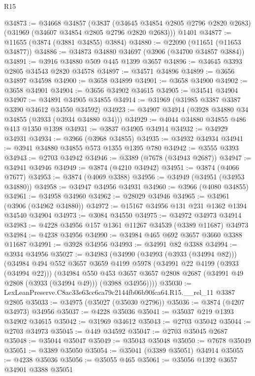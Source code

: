\begin{lexlean}{R15}
\begin{coremodule}
@34873 := @34668
    @34857
    (@3837 (@34645 @34854 @2805 @2796 @2820 @2683) (@31969 (@34607 @34854 @2805 @2796 @2820 @2683)))
    @1401
@34877 := @11655 (@3874 (@3881 @34855) @3884)
@34880 := @22090 (@11651 (@11653 @34877))
@34886 := @34873 @34880 @34697 (@3906 (@34700 @34857 @3884))
@34891 := @3916 @34880 @509 @445 @1399 @3657
@34896 := @34645 @3393 @2805 @34543 @2820 @34578
@34897 := @34571 @34896
@34899 := @3656 @34897 @34598
@34900 := @3658 @34899
@34901 := @3658 @34900
@34902 := @3658 @34901
@34904 := @3656 @34902 @34615
@34905 := @34541 @34904
@34907 := @34891 @34905 @34855
@34914 := @31969 (@31985 @3387 @3387 @3390 @34612 @34550 @34592)
@34923 := @34907 @34914 (@3928 @34880 @34 @34855 (@3933 (@3934 @34880 @34)))
@34929 := @4044 @34880 @34855 @486 @413 @1350 @1398
@34931 := @3837 @34905 @34914
@34932 := @34929 @34931
@34934 := @3966 (@3968 @34855)
@34935 := @34932 @34934
@34941 := @3941 @34880 @34855 @573 @1355 @1395 @780
@34942 := @3555 @3393
@34943 := @2703 @34942
@34946 := @3389 (@7678 (@34943 @2687))
@34947 := @34941 @34946
@34949 := @3874 (@4210 @34942)
@34951 := @3874 (@4066 @7677)
@34953 := @3874 (@4069 @3388)
@34956 := @34949 (@34951 (@34953 @34880))
@34958 := @34947 @34956 @34931
@34960 := @3966 (@4080 @34855)
@34961 := @34958 @34960
@34962 := @28029 @34946
@34965 := @34961 (@3906 (@34962 @34880))
@34972 := @15167 @34956 @131 @231 @1362 @1394 @34540 @34904
@34973 := @3084 @34550
@34975 := @34972 @34973 @34914
@34983 := @4228 @34956 @157 @1361 @11267 @34539 (@3389 @11687) @34973
@34984 := @4238 @34956
@34990 := @34984 @465 @692 @3657 @3660 @3388 @11687
@34991 := @3928 @34956
@34993 := @34991 @82 @3388
@34994 := @3934 @34956
@35027 := @34983
    (@34990
      (@34993 (@3933 (@34994 @82)))
      (@34984
        @494
        @552
        @3657
        @3659
        @4199
        @5978
        (@34991 @22 @4199 (@3933 (@34994 @22)))
        (@34984
          @550
          @453
          @3657
          @3657
          @2808
          @2687
          (@34991 @49 @2808 (@3933 (@34994 @49)))
          (@3988 @34956))))
@35030 := LexLeanPreserve.C8ac33e63cc6ca79c2144fb06b90fca64.R15.__rel_11 @3387 @2805
@35033 := @34975 (@35027 (@35030 @2796))
@35036 := @3874 (@4207 @34973) @34956
@35037 := @4228 @35036
@35041 := @35037 @219 @1393 @34902 @34615
@35042 := @31969 @34612
@35043 := @2703 @35042
@35044 := @2703 @34973
@35045 := @449 @34592
@35047 := @2703 @35045 @2687
@35048 := @35044 @35047
@35049 := @35043 @35048
@35050 := @7678 @35049
@35051 := @3389 @35050
@35054 := @35041 (@3389 @35051) @34914
@35055 := @4238 @35036
@35056 := @35055 @465
@35061 := @35056 @1392 @3657 @34901 @3388 @35051

\end{coremodule}
\end{lexlean}
